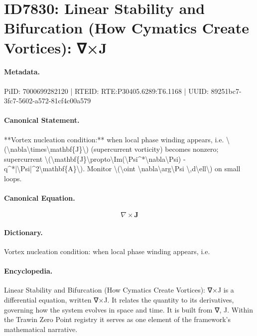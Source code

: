 \section*{ID7830: Linear Stability and Bifurcation (How Cymatics Create Vortices): ∇×J}
\paragraph{Metadata.}
PiID: 7000699282120 | RTEID: RTE:P30405.6289:T6.1168 | UUID: 89251bc7-3fc7-5602-a572-81cf4c00a579

\paragraph{Canonical Statement.}
**Vortex nucleation condition:** when local phase winding appears, i.e. \textbackslash{}(\textbackslash{}nabla\textbackslash{}times\textbackslash{}mathbf\{J\}\textbackslash{}) (supercurrent vorticity) becomes nonzero; supercurrent \textbackslash{}(\textbackslash{}mathbf\{J\}\textbackslash{}propto\textbackslash{}Im(\textbackslash{}Psi\textasciicircum{}*\textbackslash{}nabla\textbackslash{}Psi) - q\textasciicircum{}*|\textbackslash{}Psi|\textasciicircum{}2\textbackslash{}mathbf\{A\}\textbackslash{}). Monitor \textbackslash{}(\textbackslash{}oint \textbackslash{}nabla\textbackslash{}arg\textbackslash{}Psi \textbackslash{},d\textbackslash{}ell\textbackslash{}) on small loops.

\paragraph{Canonical Equation.}
\[
\nabla\times\mathbf{J}
\]

\paragraph{Dictionary.}
Vortex nucleation condition: when local phase winding appears, i.e.

\paragraph{Encyclopedia.}
Linear Stability and Bifurcation (How Cymatics Create Vortices): ∇×J is a differential equation, written ∇×J. It relates the quantity to its derivatives, governing how the system evolves in space and time. It is built from ∇, J. Within the Trawin Zero Point registry it serves as one element of the framework's mathematical narrative.
